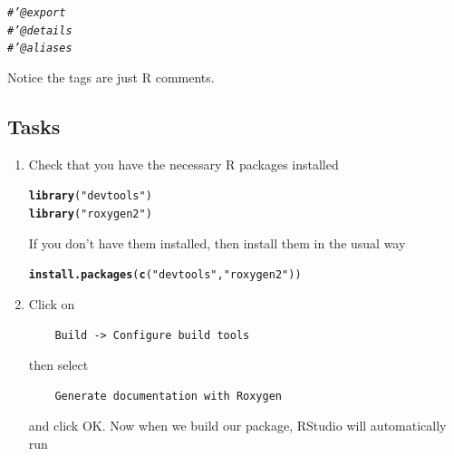 \documentclass[a4paper,justified,openany]{tufte-handout}\usepackage[]{graphicx}\usepackage[]{color}
\makeatletter
\newcommand{\hlstr}[1]{\textcolor[rgb]{0.192,0.494,0.8}{#1}}%
\newcommand{\hlcom}[1]{\textcolor[rgb]{0.678,0.584,0.686}{\textit{#1}}}%
\newcommand{\hlstd}[1]{\textcolor[rgb]{0.345,0.345,0.345}{#1}}%
\newcommand{\hlkwd}[1]{\textcolor[rgb]{0.737,0.353,0.396}{\textbf{#1}}}%
\newenvironment{kframe}{%
 \def\at@end@of@kframe{}%
 \ifinner\ifhmode%
  \def\at@end@of@kframe{\end{minipage}}%
  \begin{minipage}{\columnwidth}%
 \fi\fi%
 \def\FrameCommand##1{\hskip\@totalleftmargin \hskip-\fboxsep
 \colorbox{shadecolor}{##1}\hskip-\fboxsep
     \hskip-\linewidth \hskip-\@totalleftmargin \hskip\columnwidth}%
 \MakeFramed {\advance\hsize-\width
   \@totalleftmargin\z@ \linewidth\hsize
   \@setminipage}}%
 {\par\unskip\endMakeFramed%
 \at@end@of@kframe}
\newenvironment{knitrout}{}{} %
\makeatother
\begin{document}
\begin{knitrout}
\color{fgcolor}\begin{kframe}
\begin{alltt}
\hlcom{#' @export}
\hlcom{#' @details}
\hlcom{#' @aliases}
\end{alltt}
\end{kframe}
\end{knitrout}
\noindent Notice the tags are just R comments.

\subsection*{Tasks}

\begin{enumerate}
\item Check that you have the necessary R packages installed
\begin{knitrout}
\color{fgcolor}\begin{kframe}
\begin{alltt}
\hlkwd{library}\hlstd{(}\hlstr{"devtools"}\hlstd{)}
\hlkwd{library}\hlstd{(}\hlstr{"roxygen2"}\hlstd{)}
\end{alltt}
\end{kframe}
\end{knitrout}
If you don't have them installed, then install them in the usual way
\begin{knitrout}
\color{fgcolor}\begin{kframe}
\begin{alltt}
\hlkwd{install.packages}\hlstd{(}\hlkwd{c}\hlstd{(}\hlstr{"devtools"}\hlstd{,} \hlstr{"roxygen2"}\hlstd{))}
\end{alltt}
\end{kframe}
\end{knitrout}
\item Click on
\begin{verbatim}
    Build -> Configure build tools
\end{verbatim}
then select
\begin{verbatim}
    Generate documentation with Roxygen
\end{verbatim}
and click OK. Now when we build our package, RStudio will automatically run
\begin{knitrout}
\color{fgcolor}\begin{kframe}

\end{kframe}
\end{knitrout}
\end{enumerate}
\end{document}
